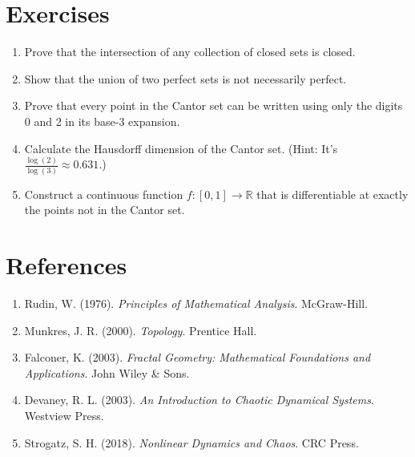 \documentclass{article}
\begin{document}
\section{Exercises}

\begin{enumerate}
    \item Prove that the intersection of any collection of closed sets is closed.
    \item Show that the union of two perfect sets is not necessarily perfect.
    \item Prove that every point in the Cantor set can be written using only the digits 0 and 2 in its base-3 expansion.
    \item Calculate the Hausdorff dimension of the Cantor set. (Hint: It's $\frac{\log(2)}{\log(3)} \approx 0.631$.)
    \item Construct a continuous function $f:[0,1] \rightarrow \mathbb{R}$ that is differentiable at exactly the points not in the Cantor set.
\end{enumerate}

\section{References}

\begin{enumerate}
    \item Rudin, W. (1976). \textit{Principles of Mathematical Analysis}. McGraw-Hill.
    \item Munkres, J. R. (2000). \textit{Topology}. Prentice Hall.
    \item Falconer, K. (2003). \textit{Fractal Geometry: Mathematical Foundations and Applications}. John Wiley \& Sons.
    \item Devaney, R. L. (2003). \textit{An Introduction to Chaotic Dynamical Systems}. Westview Press.
    \item Strogatz, S. H. (2018). \textit{Nonlinear Dynamics and Chaos}. CRC Press.
\end{enumerate}
\end{document}
